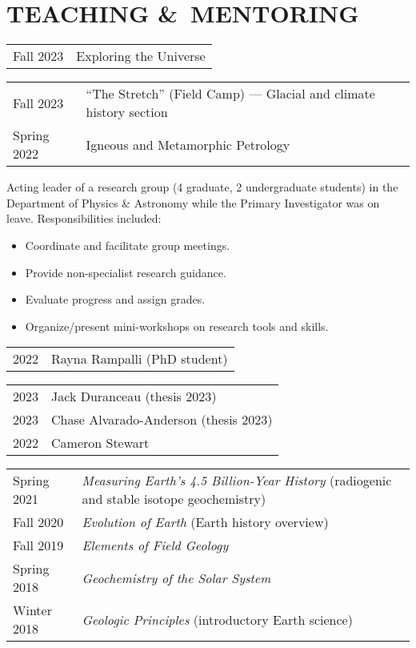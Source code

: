 \section*{TEACHING \&\ MENTORING}
\begin{tabular}{p{.15\linewidth} p{.85\linewidth}} %
	Fall 2023 & Exploring the Universe
	\end{tabular}

\begin{tabular}{p{.15\linewidth} p{.85\linewidth}} %
	Fall 2023 & ``The Stretch'' (Field Camp) --- Glacial and climate history section \\
	Spring 2022 & Igneous and Metamorphic Petrology
\end{tabular}

Acting leader of a research group (4 graduate, 2 undergraduate students) in the Department of Physics \& Astronomy while the Primary Investigator was on leave. Responsibilities included:
\begin{itemize}
\item Coordinate and facilitate group meetings.
\item Provide non-specialist research guidance.
\item Evaluate progress and assign grades.
\item Organize/present mini-workshops on research tools and skills.
\end{itemize}

\begin{tabular}{ll}
	2022\ongoing & Rayna Rampalli (PhD student)\\
\end{tabular}
\begin{tabular}{ll}
	2023 & Jack Duranceau (thesis 2023)\\
	2023 & Chase Alvarado-Anderson (thesis 2023)\\
	2022 & Cameron Stewart \\
\end{tabular}

\begin{tabular}{p{.15\linewidth} p{.85\linewidth}} %
	Spring 2021 & \textit{Measuring Earth’s 4.5 Billion-Year History} (radiogenic and stable isotope geochemistry)\\
	Fall 2020 & \textit{Evolution of Earth} (Earth history overview) \\
	Fall 2019 & \textit{Elements of Field Geology}\\
	Spring 2018 & \textit{Geochemistry of the Solar System}\\
	Winter 2018 & \textit{Geologic Principles} (introductory Earth science)
\end{tabular}

